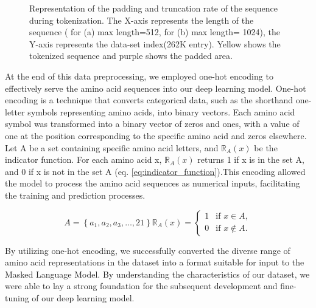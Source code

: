 \documentclass[conference]{IEEEtran}
\begin{document}
\begin{figure}[htp!]
\begin{subfigure}[b]{0.8\linewidth}
    \caption{}
    \label{fig:subfig2}
  \end{subfigure}
  \caption{Representation of the padding and truncation rate of the sequence during tokenization. The X-axis represents the length of the sequence ( for (a) max length=512, for (b) max length= 1024), the Y-axis represents the data-set index(262K entry). Yellow shows the tokenized sequence and purple shows the padded area.}
  \label{fig:Padding_Truncation}
\end{figure}



At the end of this data preprocessing, we employed one-hot encoding to effectively serve the amino acid sequences into our deep learning model. One-hot encoding is a technique that converts categorical data, such as the shorthand one-letter symbols representing amino acids, into binary vectors. Each amino acid symbol was transformed into a binary vector of zeros and ones, with a value of one at the position corresponding to the specific amino acid and zeros elsewhere. Let A be a set containing specific amino acid letters, and $\mathbb{R}_A(x)$ be the indicator function. For each amino acid x, $\mathbb{R}_A(x)$ returns 1 if x is in the set A, and 0 if x is not in the set A (eq. \ref*{eq:indicator_function}).This encoding allowed the model to process the amino acid sequences as numerical inputs, facilitating the training and prediction processes.


\begin{subequations}
  \label{eq:indicator_function}
  \begin{equation}
  A = \left \{ a_1, a_2, a_3, \ldots, 21 \right \}
  \end{equation}
  
  \begin{equation}
  \mathbb{R}_A(x) =
  \begin{cases}
  1 & \text{if } x \in A, \\
  0 & \text{if } x \notin A.
  \end{cases}
  \end{equation}
  \end{subequations}



By utilizing one-hot encoding, we successfully converted the diverse range of amino acid representations in the dataset into a format suitable for input to the Masked Language Model. By understanding the characteristics of our dataset,  we were able to lay a strong foundation for the subsequent development and fine-tuning of our deep learning model. 
\end{document}
